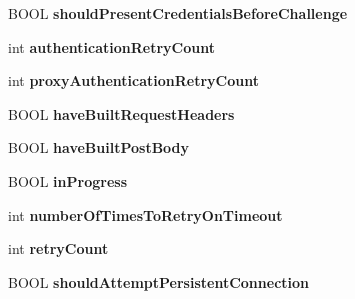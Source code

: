 \begin{DoxyCompactItemize}
\item 
\hypertarget{interface_a_s_i_h_t_t_p_request_a8978423b1982add33aff4c7dcd69dd11}{
\-B\-O\-O\-L {\bfseries should\-Present\-Credentials\-Before\-Challenge}}
\label{interface_a_s_i_h_t_t_p_request_a8978423b1982add33aff4c7dcd69dd11}

\item 
\hypertarget{interface_a_s_i_h_t_t_p_request_ab46c6643da18fc20cd709c7ec8fd982f}{
int {\bfseries authentication\-Retry\-Count}}
\label{interface_a_s_i_h_t_t_p_request_ab46c6643da18fc20cd709c7ec8fd982f}

\item 
\hypertarget{interface_a_s_i_h_t_t_p_request_af8ba258b08d290b6c301902b2a1a4676}{
int {\bfseries proxy\-Authentication\-Retry\-Count}}
\label{interface_a_s_i_h_t_t_p_request_af8ba258b08d290b6c301902b2a1a4676}

\item 
\hypertarget{interface_a_s_i_h_t_t_p_request_a977d6c3b6f20704185b4c29fefc5b216}{
\-B\-O\-O\-L {\bfseries have\-Built\-Request\-Headers}}
\label{interface_a_s_i_h_t_t_p_request_a977d6c3b6f20704185b4c29fefc5b216}

\item 
\hypertarget{interface_a_s_i_h_t_t_p_request_aa709c26bad7ac8b7ddeb6f4a67298233}{
\-B\-O\-O\-L {\bfseries have\-Built\-Post\-Body}}
\label{interface_a_s_i_h_t_t_p_request_aa709c26bad7ac8b7ddeb6f4a67298233}

\item 
\hypertarget{interface_a_s_i_h_t_t_p_request_a237c868d6b2169457731583115bf4fbe}{
\-B\-O\-O\-L {\bfseries in\-Progress}}
\label{interface_a_s_i_h_t_t_p_request_a237c868d6b2169457731583115bf4fbe}

\item 
\hypertarget{interface_a_s_i_h_t_t_p_request_a8eea10735a5448ef050bcb0abf1a8653}{
int {\bfseries number\-Of\-Times\-To\-Retry\-On\-Timeout}}
\label{interface_a_s_i_h_t_t_p_request_a8eea10735a5448ef050bcb0abf1a8653}

\item 
\hypertarget{interface_a_s_i_h_t_t_p_request_aaeea2f6419edbd89a890629d83fffadb}{
int {\bfseries retry\-Count}}
\label{interface_a_s_i_h_t_t_p_request_aaeea2f6419edbd89a890629d83fffadb}

\item 
\hypertarget{interface_a_s_i_h_t_t_p_request_ae51271a161a4b3bbba86b60ab991e1f8}{
\-B\-O\-O\-L {\bfseries should\-Attempt\-Persistent\-Connection}}
\label{interface_a_s_i_h_t_t_p_request_ae51271a161a4b3bbba86b60ab991e1f8}


\end{DoxyCompactItemize}
